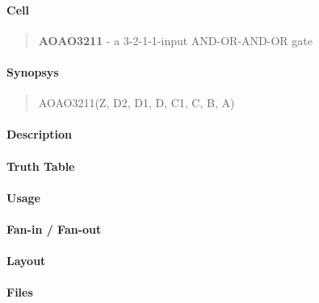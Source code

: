 \label{AOAO3211}
\paragraph{Cell}
\begin{quote}
    \textbf{AOAO3211} - a 3-2-1-1-input AND-OR-AND-OR gate
\end{quote}

\paragraph{Synopsys}
\begin{quote}
    AOAO3211(Z, D2, D1, D, C1, C, B, A)
\end{quote}

\paragraph{Description}

%

\paragraph{Truth Table}
%

\paragraph{Usage}

\paragraph{Fan-in / Fan-out}

\paragraph{Layout}

\paragraph{Files}
